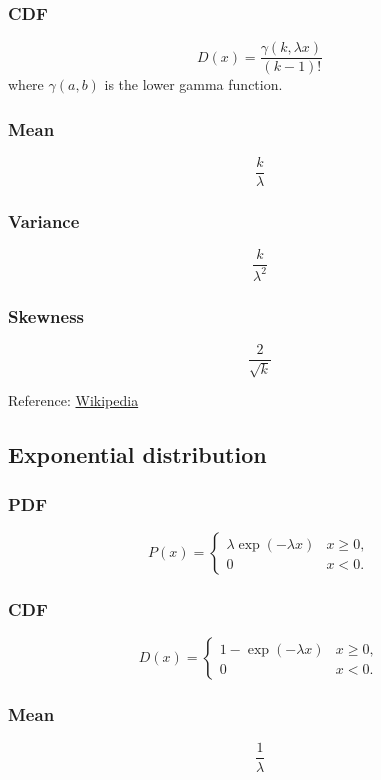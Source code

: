 \subsubsection*{CDF}
\[
    D(x) = \frac{\gamma(k, \lambda x)}{(k-1)!}
\]
where $\gamma(a,b)$ is the lower gamma function.

\subsubsection*{Mean}
\[
    \frac{k}{\lambda}
\]

\subsubsection*{Variance}
\[
    \frac{k}{\lambda^2}
\]

\subsubsection*{Skewness}
\[
    \frac{2}{\sqrt{k}}
\]

Reference:
\href{https://en.wikipedia.org/wiki/Erlang_distribution}{Wikipedia}

\subsection{Exponential distribution}

\subsubsection*{PDF}
\[
    P(x) = \begin{cases} 
        \lambda \exp{(-\lambda x)} & x\geq 0,\\
        0 & x<0.
        \end{cases}
\]

\subsubsection*{CDF}
\[
    D(x) = \begin{cases}
        1-\exp{(-\lambda x)} & x \ge 0, \\
        0 & x < 0.
        \end{cases}
\]

\subsubsection*{Mean}
\[
    \frac{1}{\lambda}
\]

